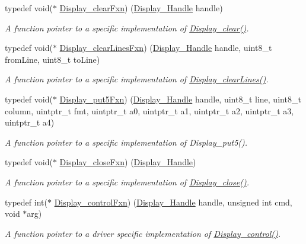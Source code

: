 \begin{DoxyCompactItemize}
typedef void($\ast$ \hyperlink{_display_8h_af09f13daab765e83adfac09551e3ee51}{Display\+\_\+clear\+Fxn}) (\hyperlink{_display_8h_a045a26811755aabf1886d982c49e54ab}{Display\+\_\+\+Handle} handle)
\begin{DoxyCompactList}\small\item\em A function pointer to a specific implementation of \hyperlink{_display_8h_ab5a031704e2a1a9525d2c1a92346f842}{Display\+\_\+clear()}. \end{DoxyCompactList}\item 
typedef void($\ast$ \hyperlink{_display_8h_a8350bd25609f51433e21b502ed50f63a}{Display\+\_\+clear\+Lines\+Fxn}) (\hyperlink{_display_8h_a045a26811755aabf1886d982c49e54ab}{Display\+\_\+\+Handle} handle, uint8\+\_\+t from\+Line, uint8\+\_\+t to\+Line)
\begin{DoxyCompactList}\small\item\em A function pointer to a specific implementation of \hyperlink{_display_8h_abae2ae910c2c533dbf11d24c656609d1}{Display\+\_\+clear\+Lines()}. \end{DoxyCompactList}\item 
typedef void($\ast$ \hyperlink{_display_8h_a86694b64b96c51c587e649d82537746d}{Display\+\_\+put5\+Fxn}) (\hyperlink{_display_8h_a045a26811755aabf1886d982c49e54ab}{Display\+\_\+\+Handle} handle, uint8\+\_\+t line, uint8\+\_\+t column, uintptr\+\_\+t fmt, uintptr\+\_\+t a0, uintptr\+\_\+t a1, uintptr\+\_\+t a2, uintptr\+\_\+t a3, uintptr\+\_\+t a4)
\begin{DoxyCompactList}\small\item\em A function pointer to a specific implementation of Display\+\_\+put5(). \end{DoxyCompactList}\item 
typedef void($\ast$ \hyperlink{_display_8h_ade8c953094781efff0f10ee0696a984f}{Display\+\_\+close\+Fxn}) (\hyperlink{_display_8h_a045a26811755aabf1886d982c49e54ab}{Display\+\_\+\+Handle})
\begin{DoxyCompactList}\small\item\em A function pointer to a specific implementation of \hyperlink{_display_8h_aea13e4e023f2b8020bed2e888cf98599}{Display\+\_\+close()}. \end{DoxyCompactList}\item 
typedef int($\ast$ \hyperlink{_display_8h_a67b559ffeebd829633512c4381858cc1}{Display\+\_\+control\+Fxn}) (\hyperlink{_display_8h_a045a26811755aabf1886d982c49e54ab}{Display\+\_\+\+Handle} handle, unsigned int cmd, void $\ast$arg)
\begin{DoxyCompactList}\small\item\em A function pointer to a driver specific implementation of \hyperlink{_display_8h_ad623d21e3c6d821bf6f4bdcfa05ec21f}{Display\+\_\+control()}. \end{DoxyCompactList}\item 

\end{DoxyCompactItemize}

